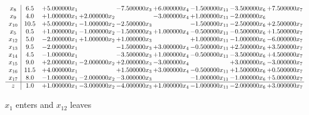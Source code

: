 \documentclass[10pt]{article}
\begin{document}
 \[\begin{array}{c| c c@{\hskip 2pt} c@{\hskip 2pt} c@{\hskip 2pt} c@{\hskip 2pt} c@{\hskip 2pt} c@{\hskip 2pt} c@{\hskip 2pt} }
 x_{8}   &  6.5 & + 5.000000 x_{1} &   & -7.500000 x_{3} & + 6.000000 x_{4} & -1.500000 x_{11} & -3.500000 x_{6} & + 7.500000 x_{7}\\
 x_{9}   &  4.0 & + 1.000000 x_{1} & + 2.000000 x_{2} &   & -3.000000 x_{4} & + 1.000000 x_{11} & -2.000000 x_{6} &   \\
 x_{10}   &  10.5 & + 5.000000 x_{1} & -1.000000 x_{2} & -2.500000 x_{3} &   & -1.500000 x_{11} & -2.500000 x_{6} & + 2.500000 x_{7}\\
 x_{5}   &  0.5 & + 1.000000 x_{1} & -1.000000 x_{2} & -1.500000 x_{3} & + 1.000000 x_{4} & -0.500000 x_{11} & -0.500000 x_{6} & + 1.500000 x_{7}\\
 x_{12}   &  5.0 & -2.000000 x_{1} & + 1.000000 x_{2} & + 1.000000 x_{3} &   & + 1.000000 x_{11} & -1.000000 x_{6} & -6.000000 x_{7}\\
 x_{13}   &  9.5 & -2.000000 x_{1} &   & -1.500000 x_{3} & + 3.000000 x_{4} & -0.500000 x_{11} & + 2.500000 x_{6} & + 3.500000 x_{7}\\
 x_{14}   &  4.5 & -1.000000 x_{1} &   & -3.500000 x_{3} & + 1.000000 x_{4} & -0.500000 x_{11} & -3.500000 x_{6} & + 4.500000 x_{7}\\
 x_{15}   &  9.0 & + 2.000000 x_{1} & -2.000000 x_{2} & + 2.000000 x_{3} & -3.000000 x_{4} &   & + 3.000000 x_{6} & -3.000000 x_{7}\\
 x_{16}   &  11.5 & + 4.000000 x_{1} &   & + 1.500000 x_{3} & + 3.000000 x_{4} & -0.500000 x_{11} & + 1.500000 x_{6} & + 0.500000 x_{7}\\
 x_{17}   &  8.0 & -1.000000 x_{1} & -2.000000 x_{2} & -3.000000 x_{3} &   & -1.000000 x_{11} & -1.000000 x_{6} & + 5.000000 x_{7}\\
\hline
z    &  1.0 & + 1.000000 x_{1} & -3.000000 x_{2} & -4.000000 x_{3} & + 1.000000 x_{4} & -1.000000 x_{11} & -2.000000 x_{6} & + 3.000000 x_{7}\\
\end{array}\]


 $ x_{1} $ enters and $ x_{12} $ leaves 
\end{document}
